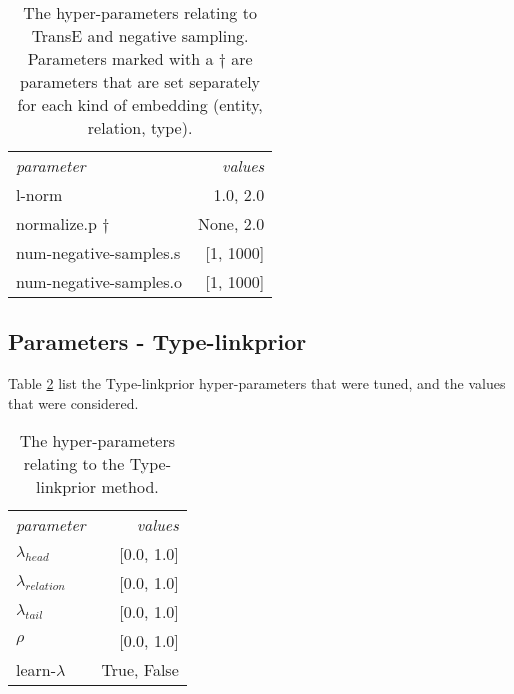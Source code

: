 \begin{table}[h!]
    \centering
    \begin{tabular}{lr}
        \toprule
        \textit{parameter}          & \textit{values}   \\
        \cmidrule{1-2}
        l-norm                      & 1.0, 2.0          \\
        normalize.p $\dagger$       & None, 2.0  \\
        \cmidrule{1-2}
        num-negative-samples.s      & [1, 1000] \\
        num-negative-samples.o      & [1, 1000] \\
        \bottomrule
    \end{tabular}
    \vspace{1cm}
    \label{tab:hyperparams-transe}
    \caption[The hyper-parameters relating to TransE and negative sampling.]{The hyper-parameters relating to TransE and negative sampling. Parameters marked with a $\dagger$ are parameters that are set separately for each kind of embedding (entity, relation, type).}
\end{table}

\subsection{Parameters - Type-linkprior}
Table \ref{tab:hyperparams-linkprior} list the Type-linkprior hyper-parameters that were tuned, and the values that were considered.
\begin{table}[h!]
    \centering
    \begin{tabular}{lr}
        \toprule
        \textit{parameter}          & \textit{values}   \\
        \cmidrule{1-2}
        $\lambda_{head}$            & [0.0, 1.0]        \\
        $\lambda_{relation}$        & [0.0, 1.0]        \\
        $\lambda_{tail}$            & [0.0, 1.0]        \\
        $\rho$                      & [0.0, 1.0]        \\
        learn-$\lambda$             & True, False       \\
        \bottomrule
    \end{tabular}
    \label{tab:hyperparams-linkprior}
    \caption[The hyper-parameters relating to the Type-linkprior method.]{The hyper-parameters relating to the Type-linkprior method. }
\end{table}



